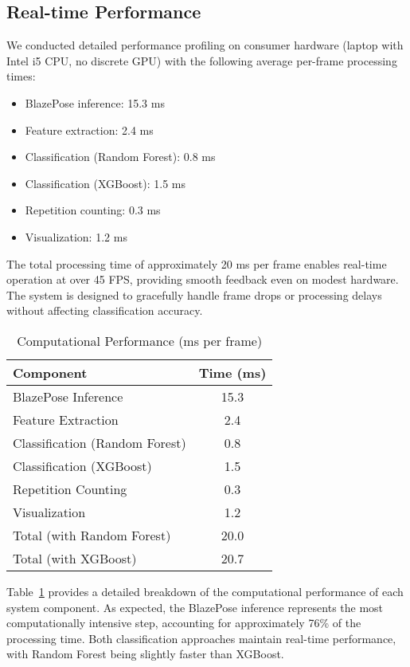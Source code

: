 \documentclass[conference]{IEEEtran}
\begin{document}
\subsection{Real-time Performance}
We conducted detailed performance profiling on consumer hardware (laptop with Intel i5 CPU, no discrete GPU) with the following average per-frame processing times:

\begin{itemize}
    \item BlazePose inference: 15.3 ms
    \item Feature extraction: 2.4 ms
    \item Classification (Random Forest): 0.8 ms
    \item Classification (XGBoost): 1.5 ms
    \item Repetition counting: 0.3 ms
    \item Visualization: 1.2 ms
\end{itemize}

The total processing time of approximately 20 ms per frame enables real-time operation at over 45 FPS, providing smooth feedback even on modest hardware. The system is designed to gracefully handle frame drops or processing delays without affecting classification accuracy.

\begin{table}[t]
  \centering
  \caption{Computational Performance (ms per frame)}
  \label{tab:computation}
  \begin{tabular}{lc}
  \toprule
  \textbf{Component} & \textbf{Time (ms)} \\
  \midrule
  BlazePose Inference & 15.3 \\
  Feature Extraction & 2.4 \\
  Classification (Random Forest) & 0.8 \\
  Classification (XGBoost) & 1.5 \\
  Repetition Counting & 0.3 \\
  Visualization & 1.2 \\
  \midrule
  Total (with Random Forest) & 20.0 \\
  Total (with XGBoost) & 20.7 \\
  \bottomrule
  \end{tabular}
\end{table}

Table~\ref{tab:computation} provides a detailed breakdown of the computational performance of each system component. As expected, the BlazePose inference represents the most computationally intensive step, accounting for approximately 76\% of the processing time. Both classification approaches maintain real-time performance, with Random Forest being slightly faster than XGBoost.
\end{document}
